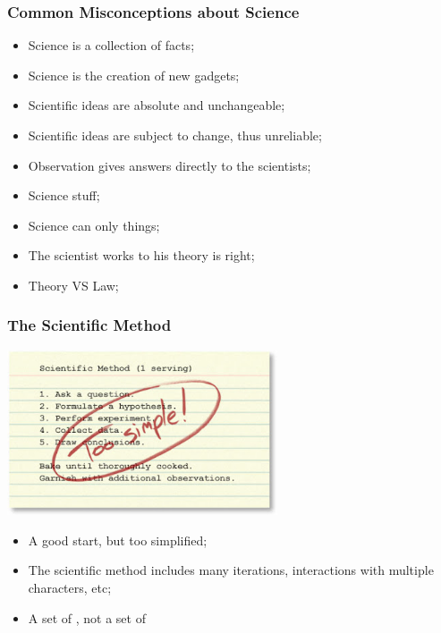 \documentclass{beamer}
\begin{document}
\begin{frame}
  \frametitle{Common Misconceptions about Science}
  \begin{itemize}
  \item Science is a collection of facts;
  \item Science is the creation of new gadgets;
  \item Scientific ideas are absolute and unchangeable;
  \item Scientific ideas are subject to change, thus unreliable;
  \item Observation gives answers directly to the scientists;
  \item Science  stuff;
  \item Science can only  things;
  \item The scientist works to  his theory is right;
  \item Theory VS Law;
  \end{itemize}
\end{frame}

\begin{frame}
  \frametitle{The Scientific Method}
  \hfill\includegraphics[width=0.6\textwidth]{img/recipe}\\
  \begin{itemize}
    \item A good start, but too simplified;
    \item The scientific method includes many iterations, interactions
      with multiple characters, etc;
    \item A set of , not a set of
  \end{itemize}
\end{frame}
\end{document}
